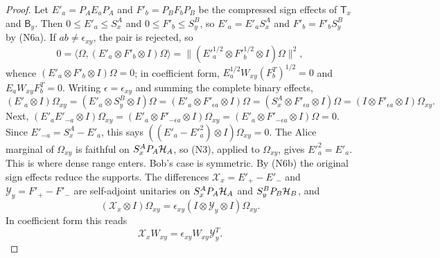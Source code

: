 \begin{proof}
Let $E'_a=P_AE_aP_A$ and $F'_b=P_BF_bP_B$ be the compressed sign effects of $\mathsf T_x$ and $\mathsf B_y$. Then $0\leq E'_a\leq S^A_x$ and $0\leq F'_b\leq S^B_y$, so $E'_a=E'_aS^A_x$ and $F'_b=F'_bS^B_y$ by (N6a). If $ab\ne\epsilon_{xy}$, the pair is rejected, so
\[
 0=\langle\Omega,(E'_a\otimes F'_b\otimes I)\Omega\rangle=\|(E'^{1/2}_a\otimes F'^{1/2}_b\otimes I)\Omega\|^2,
\]
whence $(E'_a\otimes F'_b\otimes I)\Omega=0$; in coefficient form, $E_a^{1/2}W_{xy}(F_b^T)^{1/2}=0$ and $E_aW_{xy}F_b^T=0$. Writing $\epsilon=\epsilon_{xy}$ and summing the complete binary effects,
\[
 (E'_a\otimes I)\Omega_{xy}=(E'_a\otimes S^B_y\otimes I)\Omega=(E'_a\otimes F'_{\epsilon a}\otimes I)\Omega=(S^A_x\otimes F'_{\epsilon a}\otimes I)\Omega=(I\otimes F'_{\epsilon a}\otimes I)\Omega_{xy}.
\]
Next, $(E'_aE'_{-a}\otimes I)\Omega_{xy}=(E'_a\otimes F'_{-\epsilon a}\otimes I)\Omega_{xy}=(E'_a\otimes F'_{-\epsilon a}\otimes I)\Omega=0$. Since $E'_{-a}=S^A_x-E'_a$, this says $((E'_a-E'^2_a)\otimes I)\Omega_{xy}=0$. The Alice marginal of $\Omega_{xy}$ is faithful on $S^A_xP_A\mathcal H_A$, so (N3), applied to $\Omega_{xy}$, gives $E'^2_a=E'_a$. This is where dense range enters. Bob's case is symmetric. By (N6b) the original sign effects reduce the supports. The differences $\mathcal X_x=E'_+-E'_-$ and $\mathcal Y_y=F'_+-F'_-$ are self-adjoint unitaries on $S^A_xP_A\mathcal H_A$ and $S^B_yP_B\mathcal H_B$, and
\[
 (\mathcal X_x\otimes I)\Omega_{xy}=\epsilon_{xy}(I\otimes\mathcal Y_y\otimes I)\Omega_{xy}.
\]
In coefficient form this reads
\begin{equation}\label{eq:sign}
 \mathcal X_xW_{xy}=\epsilon_{xy}W_{xy}\mathcal Y_y^T.
\end{equation}


\end{proof}

